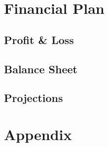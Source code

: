 \documentclass[titlepage]{article}
\begin{document}
\section{Financial Plan}
\subsection{Profit \& Loss}
\subsection{Balance Sheet}
\subsection{Projections}


\section{Appendix}
\end{document}
